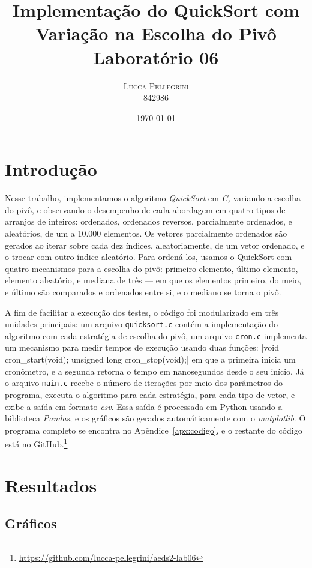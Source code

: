 \documentclass[10pt,oneside,onecolumn]{article}
\title{{\huge\bfseries Implementação do QuickSort com Variação na Escolha do
	Pivô}\\
Laboratório 06}
\author{ %
	\textsc{Lucca Pellegrini} \\
	\normalsize{842986}
}
\date{\today}
\begin{document}

\maketitle
\section{Introdução}

Nesse trabalho, implementamos o algoritmo \textit{QuickSort} em \textit{C,}
variando a escolha do pivô, e observando o desempenho de cada abordagem em
quatro tipos de arranjos de inteiros: ordenados, ordenados reversos,
parcialmente ordenados, e aleatórios, de um a 10.000 elementos. Os vetores
parcialmente ordenados são gerados ao iterar sobre cada dez índices,
aleatoriamente, de um vetor ordenado, e o trocar com outro índice aleatório.
Para ordená-los, usamos o QuickSort com quatro mecanismos para a escolha do
pivô: primeiro elemento, último elemento, elemento aleatório, e mediana de três
--- em que os elementos primeiro, do meio, e último são comparados e ordenados
entre si, e o mediano se torna o pivô.

A fim de facilitar a execução dos testes, o código foi modularizado em três
unidades principais: um arquivo \texttt{quicksort.c} contém a implementação do
algoritmo com cada estratégia de escolha do pivô, um arquivo \texttt{cron.c}
implementa um mecanismo para medir tempos de execução usando duas funções:
|void cron_start(void); unsigned long cron_stop(void);| em que a
primeira inicia um cronômetro, e a segunda retorna o tempo em nanosegundos
desde o seu início. Já o arquivo \texttt{main.c} recebe o número de iterações
por meio dos parâmetros do programa, executa o algoritmo para cada estratégia,
para cada tipo de vetor, e exibe a saída em formato \textit{csv}. Essa saída é
processada em Python usando a biblioteca \textit{Pandas}, e os gráficos são
gerados automáticamente com o \textit{matplotlib}. O programa completo se
encontra no Apêndice~\ref{apx:codigo}, e o restante do código está no
GitHub.\footnote{\url{https://github.com/lucca-pellegrini/aeds2-lab06}}

\section{Resultados}

\subsection{Gráficos}
\end{document}
